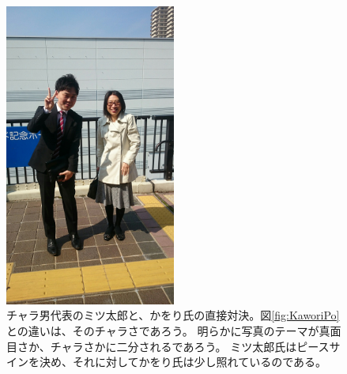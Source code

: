 \begin{figure}[H]
  \centering
  \includegraphics[width=0.5\textwidth]{./section/Kawori/figures/KaworiPika.jpg}
  \caption{チャラ男代表のミツ太郎と、かをり氏の直接対決。図\ref{fig:KaworiPo}との違いは、そのチャラさであろう。
  明らかに写真のテーマが真面目さか、チャラさかに二分されるであろう。
  ミツ太郎氏はピースサインを決め、それに対してかをり氏は少し照れているのである。
  }
\label{fig:KaworiPika}
\end{figure}
